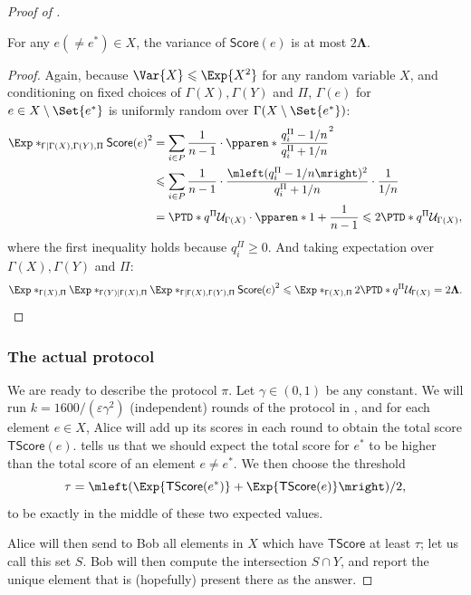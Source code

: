 \documentclass[11pt,letterpaper]{article}
\newcommand{\eps}{\varepsilon}
\renewcommand{\geq}{\geqslant}
\renewcommand{\leq}{\leqslant}
\theoremstyle{definition}
\DeclarePairedDelimiter{\pparen}()
\newcommand{\estar}{e^{\ast}}
\newcommand{\rPi}{\rv{\Pi}}
\newcommand{\Perm}{\Gamma}
\newcommand{\rPerm}{\rv{\Gamma}}
\newcommand{\uni}{\mathcal{U}}
\newcommand{\qpi}{q^{\Pi}}
\newcommand{\score}{\mathsf{Score}}
\newcommand{\totscore}{\mathsf{TScore}}
\newcommand{\rPTD}{\mathbf{\Lambda}}
\newcommand{\paren}[1]{\ensuremath{\mleft(#1\mright)}\xspace}
\newcommand{\rv}[1]{\ensuremath{\mathsf{#1}}}
\begin{document}
\begin{proof}[Proof of ]
\begin{claim}\label{clm:variance-score-other}
  For any $e (\neq \estar) \in X$, the variance of $\score(e)$ is at most
  $2\rPTD$.
\end{claim}

\begin{proof}
  Again, because $\Var{X} \leq \Exp{X^2}$ for any random variable $X$, and
  conditioning on fixed choices of $\Perm(X), \Perm(Y)$ and $\Pi$,
  $\rPerm(e)$ for $e \in X \setminus \Set{\estar}$ is uniformly random over
  $\Perm(X \setminus \Set{\estar})$:
  \begin{align*}
    \Exp*_{\rPerm \mid \Perm(X), \Perm(Y), \Pi}{{\score(e)}^2}
    &= \sum_{i \in P} \frac 1{n - 1}
    \cdot \pparen*{\frac {\qpi_i - 1 / n}{\qpi_i + 1 / n}}^2\\
    &\leq \sum_{i \in P} \frac 1{n - 1}
    \cdot \frac{\paren{\qpi_i - 1/n}^2}{\qpi_i + 1 / n} \cdot \frac 1{1 / n}\\
    &= \PTD*{\qpi}{\uni_{\Perm(X)}} \cdot \pparen*{1 + \frac 1{n - 1}}
    \leq 2\PTD*{\qpi}{ \uni_{\Perm(X)}},
  \end{align*}
  where the first inequality holds because $\qpi_i \geq 0$.
  And taking expectation over $\Perm(X), \Perm(Y)$ and $\Pi$:
  \[
    \Exp*_{\rPerm(X), \rPi}{
      \Exp*_{\rPerm(Y) \mid \rPerm(X), \rPi} {
        \Exp*_{\rPerm \mid \rPerm(X), \rPerm(Y), \rPi}{{\score(e)}^2}
      }
    }
    \leq
    \Exp*_{\rPerm(X), \rPi}{
      2\PTD*{\qpi}{\uni_{\rPerm(X)}}
    }
    = 2\rPTD.
  \]
\end{proof}

\subsubsection{The actual protocol}\label{subsec:actual-protocol}

We are ready to describe the protocol $\pi$.
Let $\gamma \in (0,1)$ be any constant.
We will run $k = 1600 / (\eps \gamma^2)$ (independent) rounds of the
protocol in , and for each element $e \in X$,
Alice will add up its scores in each round to obtain the total score $\totscore(e)$.  tells us that we should expect the total score for $\estar$ to be higher than the total score of an element $e \neq \estar$.
We then choose the threshold
\[
  \tau = \paren{\Exp{\totscore(\estar)} + \Exp{\totscore(e)}} / 2,
\]
to be exactly in the middle of these two expected values.

Alice will then send to Bob all elements in $X$ which have $\totscore$ at least
$\tau$; let us call this set $S$.
Bob will then compute the intersection $S \cap Y$, and report the unique element
that is (hopefully) present there as the answer.


\end{proof}
\end{document}
